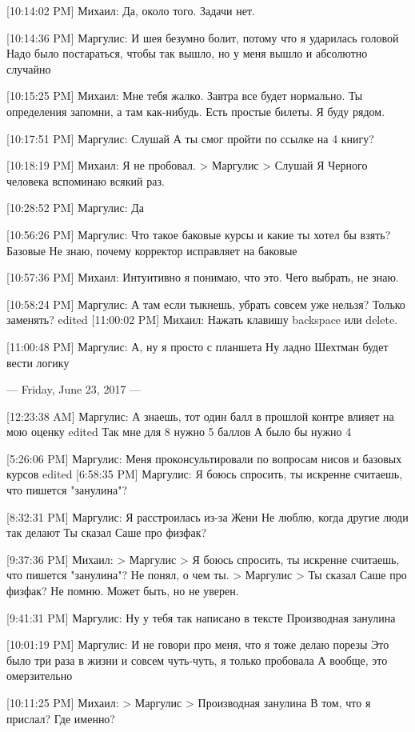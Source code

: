 \documentclass{article}
\begin{document}
[10:14:02 PM] Михаил:
Да, около того. Задачи нет.

[10:14:36 PM] Маргулис:
И шея безумно болит, потому что я ударилась головой
 Надо было постараться, чтобы так вышло, но у меня вышло и абсолютно случайно

[10:15:25 PM] Михаил:
Мне тебя жалко.
 Завтра все будет нормально. Ты определения запомни, а там как-нибудь.
 Есть простые билеты.
 Я буду рядом.

[10:17:51 PM] Маргулис:
Слушай
 А ты смог пройти по ссылке на 4 книгу?

[10:18:19 PM] Михаил:
Я не пробовал.
> Маргулис
> Слушай
Я Черного человека вспоминаю всякий раз.

[10:28:52 PM] Маргулис:
Да

[10:56:26 PM] Маргулис:
Что такое баковые курсы и какие ты хотел бы взять?
 Базовые
 Не знаю, почему корректор исправляет на баковые

[10:57:36 PM] Михаил:
Интуитивно я понимаю, что это.
 Чего выбрать, не знаю.

[10:58:24 PM] Маргулис:
А там если тыкнешь, убрать совсем уже нельзя? Только заменять?
edited 
[11:00:02 PM] Михаил:
Нажать клавишу backspace или delete.

[11:00:48 PM] Маргулис:
А, ну я просто с планшета
 Ну ладно
 Шехтман будет вести логику

--- Friday, June 23, 2017 ---

[12:23:38 AM] Маргулис:
А знаешь, тот один балл в прошлой контре влияет на мою оценку
edited 
Так мне для 8 нужно 5 баллов
 А было бы нужно 4

[5:26:06 PM] Маргулис:
Меня проконсультировали по вопросам нисов и базовых курсов
edited 
[6:58:35 PM] Маргулис:
Я боюсь спросить, ты искренне считаешь, что пишется "занулина"?

[8:32:31 PM] Маргулис:
Я расстроилась из-за Жени
 Не люблю, когда другие люди так делают
 Ты сказал Саше про физфак?

[9:37:36 PM] Михаил:
> Маргулис
> Я боюсь спросить, ты искренне считаешь, что пишется "занулина"?
Не понял, о чем ты.
> Маргулис
> Ты сказал Саше про физфак?
Не помню. Может быть, но не уверен.

[9:41:31 PM] Маргулис:
Ну у тебя так написано в тексте
 Производная занулина

[10:01:19 PM] Маргулис:
И не говори про меня, что я тоже делаю порезы
 Это было три раза в жизни и совсем чуть-чуть, я только пробовала
 А вообще, это омерзительно

[10:11:25 PM] Михаил:
> Маргулис
> Производная занулина
В том, что я прислал? Где именно?
\end{document}
